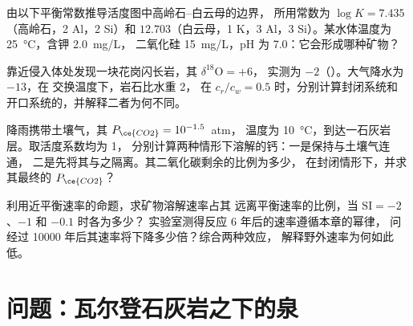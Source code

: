 \begin{exercise}[$\star\star$]\label{exo:b3:water-rock-interaction:9}
由以下平衡常数推导活度图中高岭石–白云母的边界，
所用常数为 $\log K = 7.435$（高岭石，2 Al，2 Si）和 $12.703$（白云母，1
K，3 Al，3 Si）。某水体温度为 \qty{25}{\celsius}，含钾 \qty{2.0}{mg/L}，
二氧化硅 \qty{15}{mg/L}，pH 为 7.0：它会形成哪种矿物？
\end{exercise}

\begin{exercise}[$\star\star\star$]\label{exo:b3:water-rock-interaction:10}
靠近侵入体处发现一块花岗闪长岩，其 $\delta^{18}\mathrm O = +6$，
实测为 $-2$（\unit{\permil}）。大气降水为 $-13$，在
交换温度下，岩石比水重 \qty{2}{\permil}，
在 $c_r/c_w = 0.5$ 时，分别计算封闭系统和
开口系统的，并解释二者为何不同。
\end{exercise}

\begin{exercise}[$\star\star\star$]\label{exo:b3:water-rock-interaction:11}
降雨携带土壤气，其 $P_{\ce{CO2}} = 10^{-1.5}$~atm，
温度为 \qty{10}{\celsius}，到达一石灰岩层。取活度系数均为 1，
分别计算两种情形下溶解的钙：一是保持与土壤气连通，
二是先将其与之隔离。其二氧化碳剩余的比例为多少，
在封闭情形下，并求其最终的 $P_{\ce{CO2}}$？
\end{exercise}

\begin{exercise}[$\star\star\star$]\label{exo:b3:water-rock-interaction:12}
利用近平衡速率的命题，求矿物溶解速率占其
远离平衡速率的比例，当 $\mathrm{SI} =
-2$、$-1$ 和 $-0.1$ 时各为多少？
实验室测得反应 6 年后的速率遵循本章的幂律，
问经过 \num{10000} 年后其速率将下降多少倍？综合两种效应，
解释野外速率为何如此低。
\end{exercise}

\section{问题：瓦尔登石灰岩之下的泉}

